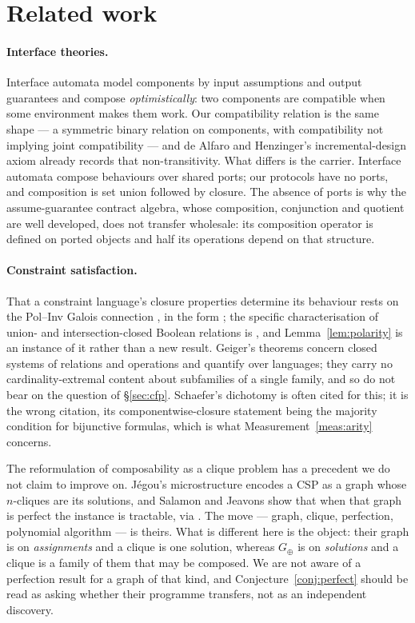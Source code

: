 \documentclass[11pt,reqno]{amsart}
\theoremstyle{plain}
\theoremstyle{definition}
\theoremstyle{remark}
\begin{document}
\section{Related work}\label{sec:related}

\paragraph{Interface theories.} Interface automata \cite{dealfaro2001} model
components by input assumptions and output guarantees and compose
\emph{optimistically}: two components are compatible when some environment makes
them work. Our compatibility relation is the same shape --- a symmetric binary
relation on components, with compatibility not implying joint compatibility ---
and de Alfaro and Henzinger's incremental-design axiom already records that
non-transitivity. What differs is the carrier. Interface automata compose
behaviours over shared ports; our protocols have no ports, and composition is set
union followed by closure. The absence of ports is why the assume-guarantee
contract algebra, whose composition, conjunction and quotient are well developed,
does not transfer wholesale: its composition operator is defined on ported
objects and half its operations depend on that structure.

\paragraph{Constraint satisfaction.} That a constraint language's closure properties determine its behaviour rests on
the Pol--Inv Galois connection \cite{geiger1968}, in the form
\cite[Thm.~32]{bkw2017}; the specific characterisation of union- and
intersection-closed Boolean relations is \cite[Ex.~5.3.5]{jeavons1997}, and
Lemma~\ref{lem:polarity} is an instance of it rather than a new result. Geiger's
theorems concern closed systems of relations and operations and quantify over
languages; they carry no cardinality-extremal content about subfamilies of a
single family, and so do not bear on the question of \S\ref{sec:cfp}. Schaefer's dichotomy \cite{schaefer1978} is often cited for
this; it is the wrong citation, its componentwise-closure statement being the
majority condition for bijunctive formulas, which is what
Measurement~\ref{meas:arity} concerns.

The reformulation of composability as a clique problem has a precedent we do not
claim to improve on. Jégou's microstructure \cite{jegou1993} encodes a CSP as a
graph whose $n$-cliques are its solutions, and Salamon and Jeavons
\cite{salamonjeavons2008} show that when that graph is perfect the instance is
tractable, via \cite{gls1981}. The move --- graph, clique, perfection,
polynomial algorithm --- is theirs. What is different here is the object: their
graph is on \emph{assignments} and a clique is one solution, whereas
$G_\oplus$ is on \emph{solutions} and a clique is a family of them that may be
composed. We are not aware of a perfection result for a graph of that kind, and
Conjecture~\ref{conj:perfect} should be read as asking whether their programme
transfers, not as an independent discovery.
\end{document}
